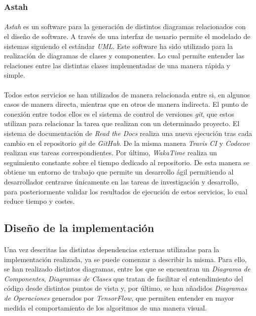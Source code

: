 \documentclass{subfiles}
\begin{document}
        \subsubsection{Astah}
        \label{sec:astah}

          \paragraph{}
          \emph{Astah} es un software para la generación de distintos diagramas relacionados con el diseño de software. A través de una interfaz de usuario permite el modelado de sistemas siguiendo el estándar \emph{UML}. Este software ha sido utilizado para la realización de diagramas de clases y componentes. Lo cual permite entender las relaciones entre las distintas clases implementadas de una manera rápida y simple.

        \paragraph{}
        Todos estos servicios se han utilizados de manera relacionada entre si, en algunos casos de manera directa, mientras que en otros de manera indirecta. El punto de conexión entre todos ellos es el sistema de control de versiones \emph{git}, que estos utilizan para relacionar la tarea que realizan con un determinado proyecto. El sistema de documentación de \emph{Read the Docs} realiza una nueva ejecución tras cada cambio en el repositorio \emph{git} de \emph{GitHub}. De la misma manera \emph{Travis CI} y \emph{Codecov} realizan sus tareas correspondientes. Por último, \emph{WakaTime} realiza un seguimiento constante sobre el tiempo dedicado al repositorio. De esta manera se obtiene un entorno de trabajo que permite un desarrollo ágil permitiendo al desarrollador centrarse únicamente en las tareas de investigación y desarrollo, para posteriormente validar los resultados de ejecución de estos servicios, lo cual reduce tiempo y costes.

      \subsection{Diseño de la implementación}
      \label{sec:implementation_design}

        \paragraph{}
        Una vez descritas las distintas dependencias externas utilizadas para la implementación realizada, ya se puede comenzar a describir la misma. Para ello, se han realizado distintos diagramas, entre los que se encuentran un \emph{Diagrama de Componentes}, \emph{Diagramas de Clases} que tratan de facilitar el entendimiento del código desde distintos puntos de vista y, por último, se han añadidos \emph{Diagramas de Operaciones} generados por \emph{TensorFlow}, que permiten entender en mayor medida el comportamiento de los algoritmos de una manera visual.
\end{document}
